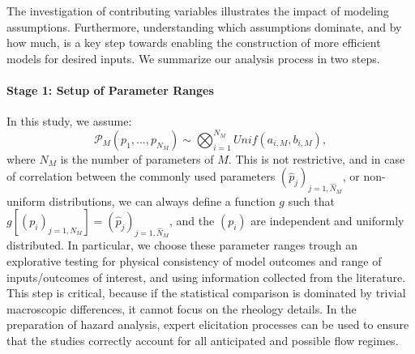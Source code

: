 \documentclass{article}
\begin{document}
%

The investigation of contributing variables illustrates the impact of modeling assumptions. Furthermore, understanding which assumptions dominate, and by how much, is a key step towards enabling the construction of more efficient models for desired inputs. %
We summarize our analysis process in two steps.
%
\paragraph{Stage 1: Setup of Parameter Ranges} In this study, we assume:
$$\mathcal P_M\left(p_1,\dots,p_{N_M}\right)\sim \bigotimes_{i=1}^{N_M} Unif(a_{i,M},b_{i,M}),$$
where $N_M$ is the number of parameters of $M$. This is not restrictive, and in case of correlation between the commonly used parameters $(\hat p_j)_{j=1,\hat N_M}$, or non-uniform distributions, we can always define a function $g$ such that $g[(p_i)_{j=1, N_M}]=(\hat p_j)_{j=1,\hat N_M}$, and the $(p_i)$ are independent and uniformly distributed. In particular, we choose these parameter ranges trough an explorative testing for physical consistency of model outcomes and range of inputs/outcomes of interest, and using information collected from the literature. {This step is critical, because if the statistical comparison is dominated by trivial macroscopic differences, it cannot focus on the rheology details.}  In the preparation of hazard analysis, expert elicitation processes can be used to ensure that the studies correctly account for all anticipated and possible flow regimes.
%
\end{document}
